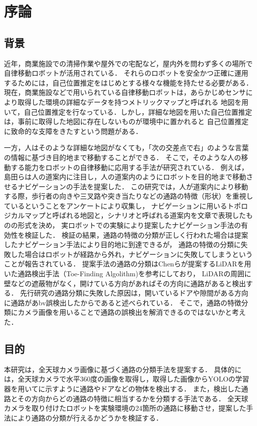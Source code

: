 \documentclass[../main]{subfiles}
\begin{document}
    \setcounter{secnumdepth}{2}
    \chapter{序論}
        \section{背景}
        近年，商業施設での清掃作業や屋外での宅配など，屋内外を問わず多くの場所で自律移動ロボットが活用されている．
        それらのロボットを安全かつ正確に運用するためには，自己位置推定をはじめとする様々な機能を持たせる必要がある．
        現在，商業施設などで用いられている自律移動ロボットは，あらかじめセンサにより取得した環境の詳細なデータを持つメトリックマップと呼ばれる
        地図を用いて，自己位置推定を行なっている．しかし，詳細な地図を用いた自己位置推定は，事前に取得した地図に存在しないものが環境中に置かれると
        自己位置推定に致命的な支障をきたすという問題がある．
        
        
        一方，人はそのような詳細な地図がなくても，「次の交差点で右」のような言葉の情報に基づき目的地まで移動することができる．
        そこで，そのような人の移動する能力をロボットの自律移動に応用する手法が研究されている．
        例えば，島田らは人の道案内に注目し，人の道案内のようにロボットを目的地まで移動させるナビゲーションの手法を提案した\cite{shimada_paper1}\cite{shimada_paper2}．
        この研究では，人が道案内により移動する際，歩行者の向きや三叉路や突き当たりなどの通路の特徴（形状）を重視しているということをアンケートにより収集し，
        ナビゲーションに用いるトポロジカルマップと呼ばれる地図と，シナリオと呼ばれる道案内を文章で表現したものの形式を決め，
        実ロボットでの実験により提案したナビゲーション手法の有効性を検証した．
        検証の結果，通路の特徴の分類が正しく行われた場合は提案したナビゲーション手法により目的地に到達できるが，
        通路の特徴の分類に失敗した場合はロボットが経路から外れ，ナビゲーションに失敗してしまうということが報告されている．
        提案手法の通路の分類はChenらが提案するLiDARを用いた通路検出手法（Toe-Finding Algolithm)\cite{toe-finding_paper}を参考にしており，
        LiDARの周囲に壁などの遮蔽物がなく，開けている方向があればその方向に通路があると検出する．
        先行研究の通路分類に失敗した原因は，開いているドアや隙間がある方向に通路があbv誤検出したからであると述べられている．
        そこで，通路の特徴分類にカメラ画像を用いることで通路の誤検出を解消できるのではないかと考えた．

        \newpage

        \section{目的}
        本研究は，全天球カメラ画像に基づく通路の分類手法を提案する．
        具体的には，全天球カメラで水平360度の画像を取得し，取得した画像からYOLOの学習器を用いてに示すように通路やドアなどの物体を検出する．
        また，検出した通路とその方向からどの通路の特徴に相当するかを分類する手法である．
        全天球カメラを取り付けたロボットを実験環境の24箇所の通路に移動させ，提案した手法により通路の分類が行えるかどうかを検証する．
        
\end{document}
